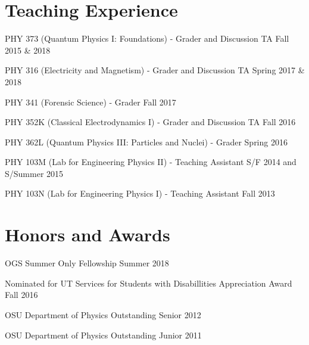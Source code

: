 \documentclass[letterpaper]{article}
\renewenvironment{itemize}{
  \begin{list}{}{
    \setlength{\leftmargin}{1.5em}
  }
}{
  \end{list}
}
\begin{document}
\section*{Teaching Experience}
\begin{itemize}

\item PHY 373 (Quantum Physics I: Foundations) - Grader and Discussion TA \hfill{Fall 2015 \& 2018}

\item PHY 316 (Electricity and Magnetism) - Grader and Discussion TA \hfill Spring 2017 \& 2018

\item PHY 341 (Forensic Science) - Grader \hfill Fall 2017

\item PHY 352K (Classical Electrodynamics I) - Grader and Discussion TA \hfill Fall 2016

\item PHY 362L (Quantum Physics III: Particles and Nuclei) - Grader \hfill{Spring 2016}

\item PHY 103M (Lab for Engineering Physics II) - Teaching Assistant \hfill {S/F 2014 and S/Summer 2015}

\item PHY 103N (Lab for Engineering Physics I) - Teaching Assistant \hfill {Fall 2013}

\end{itemize}

\section*{Honors and Awards}
\begin{itemize} \itemsep1pt \parskip0pt 

\item OGS Summer Only Fellowship \hfill{Summer 2018}

\item Nominated for UT Services for Students with Disabillities Appreciation Award \hfill{Fall 2016}

\item OSU Department of Physics Outstanding Senior \hfill{2012}

\item OSU Department of Physics Outstanding Junior \hfill{2011}
\end{itemize}
\end{document}
